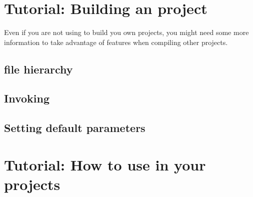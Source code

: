 
\chapter{Tutorial: Building an \ocpbuild{} project}

Even if you are not using \ocpbuild{} to build you own projects, you
might need some more information to take advantage of \ocpbuild{}
features when compiling other projects.

\section{\ocpbuild{} file hierarchy}

\section{Invoking \ocpbuild{}}

\section{Setting \ocpbuild{} default parameters}

\chapter{Tutorial: How to use \ocpbuild{} in your projects}

